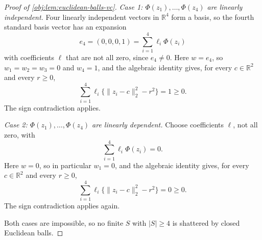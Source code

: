 \begin{proof}[Proof of \cref{obj:lem:euclidean-balls-vc}]
\emph{Case 1: \(\Phi(z_1),\ldots,\Phi(z_4)\) are linearly independent.}  Four linearly
independent vectors in \(\mathbb R^4\) form a basis, so the fourth standard basis vector has
an expansion
\[
e_4=(0,0,0,1)=\sum_{i=1}^4\ell_i\Phi(z_i)
\]
with coefficients \(\ell\) that are not all zero, since \(e_4\neq0\).  Here \(w=e_4\), so
\(w_1=w_2=w_3=0\) and \(w_4=1\), and the algebraic identity gives, for every
\(c\in\mathbb R^2\) and every \(r\ge0\),
\[
\sum_{i=1}^4\ell_i\{\|z_i-c\|_2^2-r^2\}=1\ge0 .
\]
The sign contradiction applies.

\emph{Case 2: \(\Phi(z_1),\ldots,\Phi(z_4)\) are linearly dependent.}  Choose coefficients
\(\ell\), not all zero, with
\[
\sum_{i=1}^4\ell_i\Phi(z_i)=0 .
\]
Here \(w=0\), so in particular \(w_1=0\), and the algebraic identity gives, for every
\(c\in\mathbb R^2\) and every \(r\ge0\),
\[
\sum_{i=1}^4\ell_i\{\|z_i-c\|_2^2-r^2\}=0\ge0 .
\]
The sign contradiction applies again.

Both cases are impossible, so no finite \(S\) with \(|S|\ge4\) is shattered by closed
Euclidean balls.
\end{proof}
